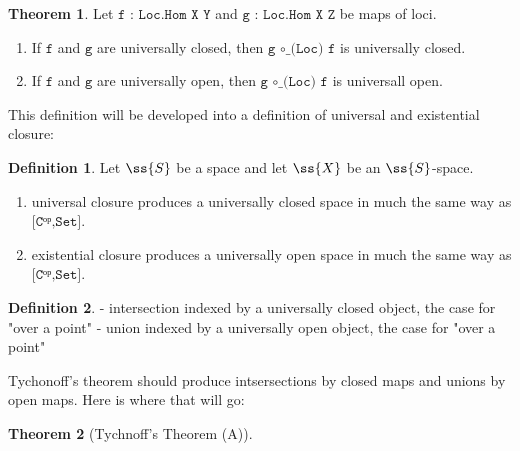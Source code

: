 \documentclass{book}
\theoremstyle{definition}
\newtheorem{definition}{Definition}
\newtheorem{theorem}{Theorem}
\begin{document}
\begin{theorem}
Let $\texttt{f : Loc.Hom X Y}$ and $\texttt{g : Loc.Hom X Z}$ be maps of loci.
\begin{enumerate}
\item If $\texttt{f}$ and $\texttt{g}$ are universally closed, then $\texttt{g ∘\_(Loc) f}$ is universally closed.
\item If $\texttt{f}$ and $\texttt{g}$ are universally open, then $\texttt{g ∘\_(Loc) f}$ is universall open. 
\end{enumerate}
\end{theorem}

This definition will be developed into a definition of universal and existential closure:

\begin{definition}
Let $\ss{S}$ be a space and let $\ss{X}$ be an $\ss{S}$-space. 
\begin{enumerate}
\item universal closure produces a universally closed space in much the same way as $\texttt{[Cᵒᵖ,Set]}$.
\item existential closure produces a universally open space in much the same way as $\texttt{[Cᵒᵖ,Set]}$.
\end{enumerate}
\end{definition}

\begin{definition}
- intersection indexed by a universally closed object, the case for "over a point"
- union indexed by a universally open object, the case for "over a point"
\end{definition}

Tychonoff's theorem should produce intsersections by closed maps and unions by open maps. Here is where that will go:

\begin{theorem}[Tychnoff's Theorem (A)]

\end{theorem}
\end{document}
